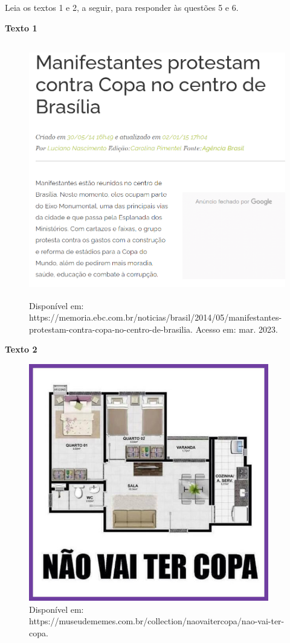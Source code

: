 
\noindent Leia os textos 1 e 2, a seguir, para responder às questões 5 e 6.


\noindent\textbf{Texto 1}\quad

\begin{figure}[H]
\centering\includegraphics[width=4.80833in,height=4.39331in]{./imgSAEB_6_POR/media/image47.png}
\caption{Disponível em: https://memoria.ebc.com.br/noticias/brasil/2014/05/manifestantes-protestam-contra-copa-no-centro-de-brasilia.
Acesso em: mar. 2023.}
\end{figure}



\noindent\textbf{Texto 2}\quad

\begin{figure}[H]
\centering\includegraphics[width=4.125in,height=4.08668in]{./imgSAEB_6_POR/media/image48.jpeg}
\caption{Disponível em: https://museudememes.com.br/collection/naovaitercopa/nao-vai-ter-copa.}
\end{figure}

